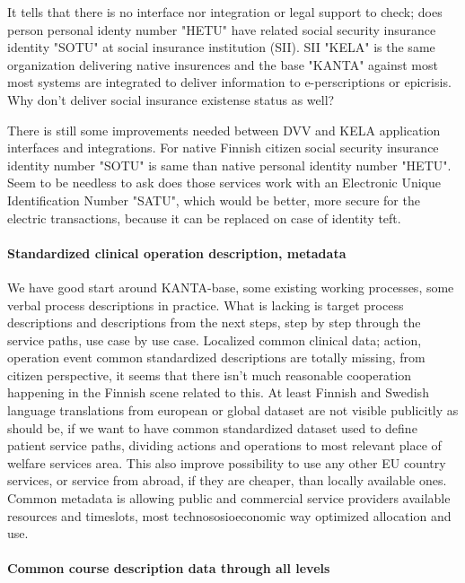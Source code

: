 It tells that there is no interface nor integration or legal support to check;
does person personal identy number "HETU" have related social security
insurance identity "SOTU" at social insurance institution (SII). SII "KELA" is
the same organization delivering native insurences and the base "KANTA"
against most most systems are integrated to deliver information to
e-perscriptions or epicrisis. Why don't deliver social insurance existense
status as well?

There is still some improvements needed between DVV and KELA application
interfaces and integrations. For native Finnish citizen social security
insurance identity number "SOTU" is same than native personal identity number
"HETU". Seem to be needless to ask does those services work with an Electronic
Unique Identification Number "SATU", which would be better, more secure for
the electric transactions, because it can be replaced on case of identity
teft.

\paragraph{Standardized clinical operation description, metadata}
\label{clinical_data}

We have good start around KANTA-base, some existing working processes, some
verbal process descriptions in practice. What is lacking is target process
descriptions and descriptions from the next steps, step by step through the
service paths, use case by use case\allowbreak\cite{
 LifeEventDetailDrivenProcessQuides}. Localized common clinical
data\allowbreak\cite{HealthEventsActionsMetaData}; action, operation event
common standardized descriptions are totally missing, from citizen
perspective, it seems that there isn't much reasonable cooperation happening
in the Finnish scene related to this. At least Finnish and Swedish language
translations from european or global dataset are not visible publicitly as
should be, if we want to have common standardized dataset used to define
patient service paths, dividing actions and operations to most relevant place
of welfare services area. This also improve possibility to use any other EU
country services, or service from abroad, if they are cheaper, than locally
available ones. Common metadata is allowing public and commercial service
providers available resources and timeslots, most technososioeconomic way
optimized allocation and use.

\paragraph{Common course description data through all levels}
\label{course_data}


